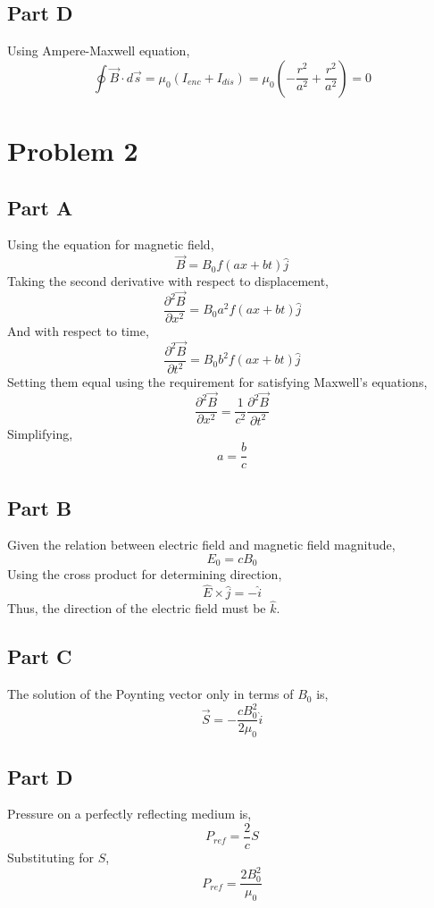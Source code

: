 \documentclass{article}
\begin{document}
\subsection*{Part D}

Using Ampere-Maxwell equation,
$$ \oint \vec{B} \cdot d\vec{s} = \mu_0 \left( I_{enc} + I_{dis} \right) = \mu_0
\left( -\frac{r^2}{a^2} + \frac{r^2}{a^2} \right) = 0 $$

\section*{Problem 2}

\subsection*{Part A}

Using the equation for magnetic field,
$$ \vec{B} = B_0 f(ax + bt) \hat{j} $$
Taking the second derivative with respect to displacement,
$$ \frac{\partial^2 \vec{B}}{\partial x^2} = B_0 a^2 f(ax + bt) \hat{j} $$
And with respect to time,
$$ \frac{\partial^2 \vec{B}}{\partial t^2} = B_0 b^2 f(ax + bt) \hat{j} $$
Setting them equal using the requirement for satisfying Maxwell's equations,
$$ \frac{\partial^2 \vec{B}}{\partial x^2} = \frac{1}{c^2} \frac{\partial^2
\vec{B}}{\partial t^2} $$
Simplifying,
$$ a = \frac{b}{c} $$

\subsection*{Part B}

Given the relation between electric field and magnetic field magnitude,
$$ E_0 = c B_0 $$
Using the cross product for determining direction,
$$ \hat{E} \times \hat{j} = -\hat{i} $$
Thus, the direction of the electric field must be $\hat{k}$.

\subsection*{Part C}

The solution of the Poynting vector only in terms of $B_0$ is,
$$ \vec{S} = -\frac{c B_0^2}{2 \mu_0} \hat{i} $$

\subsection*{Part D}

Pressure on a perfectly reflecting medium is,
$$ P_{ref} = \frac{2}{c} S $$
Substituting for $S$,
$$ P_{ref} = \frac{2 B_0^2}{\mu_0} $$
\end{document}
